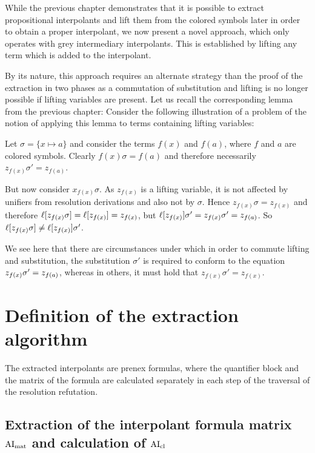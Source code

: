 \documentclass[,%
	draft=false,%
	numbers=noendperiod
	11pt,
	a4paper,
	oneside,%
	openany,
]{memoir}
\begin{document}
While the previous chapter demonstrates that it is possible to extract propositional interpolants and lift them from the colored symbols later in order to obtain a proper interpolant, we now present a novel approach, which only operates with grey intermediary interpolants.
This is established by lifting any term which is added to the interpolant. 

By its nature, this approach requires an alternate strategy than the proof of the extraction in two phases as a commutation of substitution and lifting is no longer possible if lifting variables are present.
Let us recall the corresponding lemma from the previous chapter:
\lemmaCommutLiftSubst*
Consider the following illustration of a problem of the notion of applying this lemma to terms containing lifting variables:

\begin{exa}
	Let $\sigma = \{x \mapsto a\}$
	and consider the terms $f(x)$ and $f(a)$, where $f$ and $a$ are colored symbols.
	Clearly $f(x)\sigma = f(a)$ and therefore necessarily $z_{f(x)}\sigma' = z_{f(a)}$.

	But now consider $x_{f(x)} \sigma$.
	As $z_{f(x)}$ is a lifting variable, it is not affected by unifiers from resolution derivations and also not by $\sigma$.
	Hence $z_{f(x)}\sigma = z_{f(x)}$ and therefore $\ell[z_{f(x)}\sigma] = \ell[z_{f(x)}] = z_{f(x)}$, but $\ell[z_{f(x)}]\sigma' = z_{f(x)}\sigma' = z_{f(a)}$.
	So $\ell[z_{f(x)}\sigma] \neq \ell[z_{f(x)}]\sigma'$.

	We see here that there are circumstances under which in order to commute lifting and substitution,
	the substitution $\sigma'$ is required to conform to the equation
	$z_{f(x)}\sigma' =\nolinebreak z_{f(a)}$, 
	whereas in others, it must hold that
	$z_{f(x)}\sigma' = z_{f(x)}$.
\end{exa}


\section{Definition of the extraction algorithm}

The extracted interpolants are prenex formulas, where 
the quantifier block and the matrix of the formula are calculated separately in each step of the traversal of the resolution refutation.


\subsection{Extraction of the interpolant formula matrix $\operatorname{AI}_\mathrm{mat}$ and calculation of $\operatorname{AI}_\mathrm{cl}$}
\end{document}
